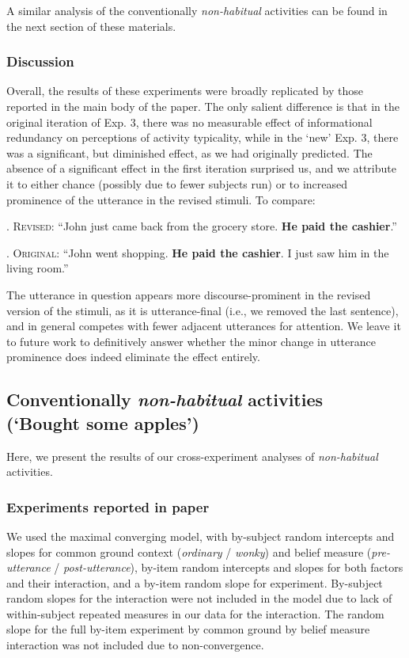 \documentclass{sp}\usepackage[]{graphicx}\usepackage[]{color}
\begin{document}
A similar analysis of the conventionally \textit{non-habitual} activities can be found in the next section of these materials.

\subsubsection{Discussion}

Overall, the results of these experiments were broadly replicated by those reported in the main body of the paper.  The only salient difference is that in the original iteration of Exp. 3, there was no measurable effect of informational redundancy on perceptions of activity typicality, while in the `new' Exp. 3, there was a significant, but diminished effect, as we had originally predicted.  The absence of a significant effect in the first iteration surprised us, and we attribute it to either chance (possibly due to fewer subjects run) or to increased prominence of the utterance in the revised stimuli.  To compare:

\ex. \textsc{Revised:} ``John just came back from the grocery store. \textbf{He paid the cashier}.''

\ex. \textsc{Original:} ``John went shopping. \textbf{He paid the cashier}. I just saw him in the living room.''

The utterance in question appears more discourse-prominent in the revised version of the stimuli, as it is utterance-final (i.e., we removed the last sentence), and in general competes with fewer adjacent utterances for attention.  We leave it to future work to definitively answer whether the minor change in utterance prominence does indeed eliminate the effect entirely.

\pagebreak

\subsection{Conventionally \textit{non-habitual} activities$\quad$(`Bought some apples')}

Here, we present the results of our cross-experiment analyses of \textit{non-habitual} activities.

\subsubsection{Experiments reported in paper}

We used the maximal converging model, with by-subject random intercepts and slopes for common ground context (\textit{ordinary} / \textit{wonky}) and belief measure (\textit{pre-utterance} / \textit{post-utterance}), by-item random intercepts and slopes for both factors and their interaction, and a by-item random slope for experiment. By-subject random slopes for the interaction were not included in the model due to lack of within-subject repeated measures in our data for the interaction. The random slope for the full by-item experiment by common ground by belief measure interaction was not included due to non-convergence.
\end{document}
